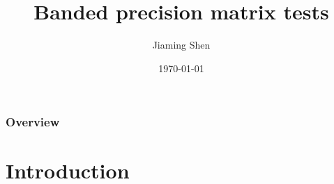 \documentclass{beamer}
\title[Statistical Learning]{Banded precision matrix tests} %
\author{Jiaming Shen} %
\institute[UoM] %
{
University of Manchester \\ %
\medskip
\textit{jiaming.shen@postgrad.man.ac.uk} %
}
\date{\today} %
\begin{document}
\begin{frame}
\titlepage %
\end{frame}

\begin{frame}
\frametitle{Overview} %
\tableofcontents %
\end{frame}


\section{Introduction} %

\end{document}
